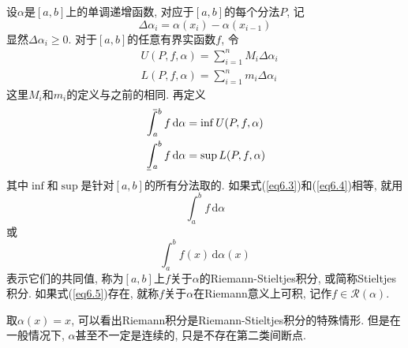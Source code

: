 \documentclass[cn,12pt,math=mtpro2,citestyle=gb7714-2015,bibstyle=gb7714-2015,twocol]{elegantbook}
\newcommand{\da}{\,\text{d}\alpha}
\def\upint{\mathchoice%
    {\mkern13mu\overline{\vphantom{\intop}\mkern7mu}\mkern-20mu}%
    {\mkern7mu\overline{\vphantom{\intop}\mkern7mu}\mkern-14mu}%
    {\mkern7mu\overline{\vphantom{\intop}\mkern7mu}\mkern-14mu}%
    {\mkern7mu\overline{\vphantom{\intop}\mkern7mu}\mkern-14mu}%
  \int}
\def\lowint{\mkern3mu\underline{\vphantom{\intop}\mkern7mu}\mkern-10mu\int}
\begin{document}
设$\alpha$是$[a,b]$上的单调递增函数, 对应于$[a,b]$的每个分法$P$, 记
$$\Delta\alpha_i=\alpha(x_i)-\alpha(x_{i-1})$$
显然$\Delta\alpha_i\geq0$. 对于$[a,b]$的任意有界实函数$f$, 令
\begin{align*}
&U(P,f,\alpha)=\sum_{i=1}^{n}M_i\Delta\alpha_i \\
&L(P,f,\alpha)=\sum_{i=1}^{n}m_i\Delta\alpha_i
\end{align*}
这里$M_i$和$m_i$的定义与之前的相同. 再定义
\begin{align}
&\upint_{a}^{b} f\da=\inf U(P,f,\alpha) \label{eq6.3} \\
&\lowint_{a}^{b} f\da=\sup L(P,f,\alpha) \label{eq6.4}
\end{align}
其中$\inf$和$\sup$是针对$[a,b]$的所有分法取的. 如果式(\ref{eq6.3})和(\ref{eq6.4})相等, 就用
\begin{equation}\label{eq6.5}
  \int_{a}^{b}f\da
\end{equation}
或
$$\int_{a}^{b}f(x)\da(x)$$
表示它们的共同值, 称为$[a,b]$上$f$关于$\alpha$的Riemann-Stieltjes积分, 或简称Stieltjes积分. 如果式(\ref{eq6.5})存在, 就称$f$关于$\alpha$在Riemann意义上可积, 记作$f\in\mathscr{R}(\alpha)$.

取$\alpha(x)=x$, 可以看出Riemann积分是Riemann-Stieltjes积分的特殊情形. 但是在一般情况下, $\alpha$甚至不一定是连续的, 只是不存在第二类间断点.
\end{document}
